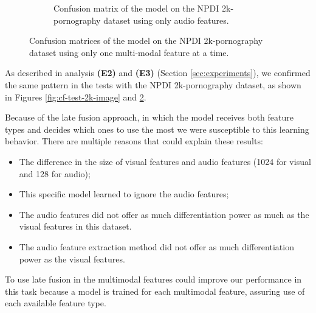 \begin{figure}[!ht]
\begin{subfigure}[b]{0.49\textwidth}
        \caption{Confusion matrix of the model on the NPDI 2k-pornography dataset using only audio features.}
        \label{fig:cf-test-2k-audio}
    \end{subfigure}
    \caption{Confusion matrices of the model on the NPDI 2k-pornography dataset using only one multi-modal feature at a time.}
\end{figure}

As described in analysis \textbf{(E2)} and \textbf{(E3)} (Section \ref{sec:experiments}), we confirmed the same pattern in the tests with the NPDI 2k-pornography dataset, as shown in Figures \ref{fig:cf-test-2k-image} and \ref{fig:cf-test-2k-audio}.%

Because of the late fusion approach, in which the model receives both feature types and decides which ones to use the most we were susceptible to this learning behavior.
There are multiple reasons that could explain these results:
\begin{itemize}
    \item The difference in the size of visual features and audio features (1024 for visual and 128 for audio);
    \item This specific model learned to ignore the audio features;
    \item The audio features did not offer as much differentiation power as much as the visual features in this dataset.
    \item The audio feature extraction method did not offer as much differentiation power as the visual features.
\end{itemize}

To use late fusion in the multimodal features could improve our performance in this task because a model is trained for each multimodal feature, assuring use of each available feature type.

